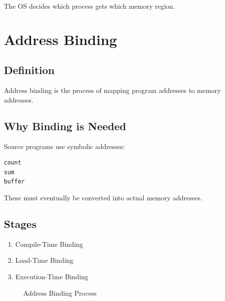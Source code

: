 The OS decides which process gets which memory region.

\section{Address Binding}

\subsection{Definition}

Address binding is the process of mapping program addresses to memory addresses.

\subsection{Why Binding is Needed}

Source programs use symbolic addresses:

\begin{verbatim}
count
sum
buffer
\end{verbatim}

These must eventually be converted into actual memory addresses.

\subsection{Stages}

\begin{enumerate}
\item Compile-Time Binding
\item Load-Time Binding
\item Execution-Time Binding
\end{enumerate}

\begin{figure}[H]
\centering
{}
\caption{Address Binding Process}
\end{figure}

